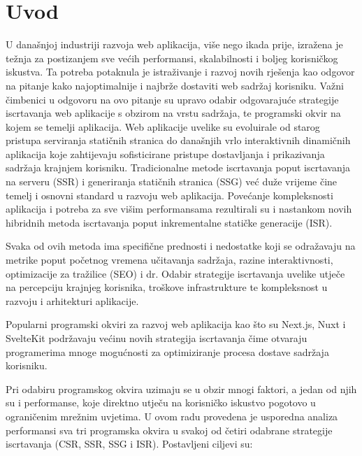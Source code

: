 \section{Uvod}

U današnjoj industriji razvoja web aplikacija, više nego ikada prije, izražena je težnja za postizanjem sve većih performansi, skalabilnosti i boljeg korisničkog iskustva. Ta potreba potaknula je istraživanje i razvoj novih rješenja kao odgovor na pitanje kako najoptimalnije i najbrže dostaviti web sadržaj korisniku. Važni čimbenici u odgovoru na ovo pitanje su upravo odabir odgovarajuće strategije iscrtavanja web aplikacije s obzirom na vrstu sadržaja, te programski okvir na kojem se temelji aplikacija. Web aplikacije uvelike su evoluirale od starog pristupa serviranja statičnih stranica do današnjih vrlo interaktivnih dinamičnih aplikacija koje zahtijevaju sofisticirane pristupe dostavljanja i prikazivanja sadržaja krajnjem korisniku. \cite{moore2024rendering} Tradicionalne metode iscrtavanja poput iscrtavanja na serveru (SSR) i generiranja statičnih stranica (SSG) već duže vrijeme čine temelj i osnovni standard u razvoju web aplikacija. Povećanje kompleksnosti aplikacija i potreba za sve višim performansama rezultirali su i nastankom novih hibridnih metoda iscrtavanja poput inkrementalne statičke generacije (ISR).

\bigskip

Svaka od ovih metoda ima specifične prednosti i nedostatke koji se odražavaju na metrike poput početnog vremena učitavanja sadržaja, razine interaktivnosti, optimizacije za tražilice (SEO) i dr. Odabir strategije iscrtavanja uvelike utječe na percepciju krajnjeg korisnika, troškove infrastrukture te kompleksnost u razvoju i arhitekturi aplikacije.

\bigskip

Popularni programski okviri za razvoj web aplikacija kao što su Next.js, Nuxt i SvelteKit podržavaju većinu novih strategija iscrtavanja čime otvaraju programerima mnoge mogućnosti za optimiziranje procesa dostave sadržaja korisniku.

\bigskip

Pri odabiru programskog okvira uzimaju se u obzir mnogi faktori, a jedan od njih su i performanse, koje direktno utječu na korisničko iskustvo pogotovo u ograničenim mrežnim uvjetima.
U ovom radu provedena je usporedna analiza performansi sva tri programska okvira u svakoj od  četiri odabrane strategije iscrtavanja (CSR, SSR, SSG i ISR). Postavljeni ciljevi su:

